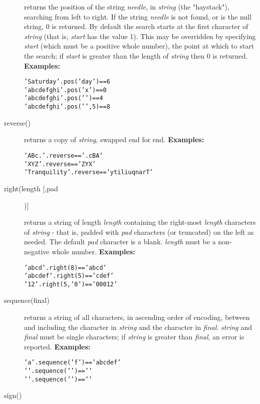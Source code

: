 \begin{description}
returns the position of the string \emph{needle}, in
\emph{string} (the "haystack"), searching from left to right.
If the string \emph{needle} is not found, or is the null string,
0 is returned.
By default the search starts at the first character of
\emph{string} (that is, \emph{start} has the value 1).
This may be overridden by specifying \emph{start} (which must be a
positive whole number), the point at which to start the search; if
\emph{start} is greater than the length of \emph{string} then 0
is returned.
 \textbf{Examples:}
\begin{alltt}
'Saturday'.pos('day')    == 6
'abc def ghi'.pos('x')   == 0
'abc def ghi'.pos(' ')   == 4
'abc def ghi'.pos(' ',5) == 8
\end{alltt}
\item[reverse()]\label{refreverse}

returns a copy of \emph{string}, swapped end for end.
 \textbf{Examples:}
\begin{alltt}
'ABc.'.reverse        == '.cBA'
'XYZ '.reverse        == ' ZYX'
'Tranquility'.reverse == 'ytiliuqnarT'
\end{alltt}
\item[right(length [,pad])]\label{refright}

returns a string of length \emph{length} containing the
right-most \emph{length} characters of \emph{string} -
that is, padded with \emph{pad} characters (or truncated) on the
left as needed.  The default \emph{pad} character is a blank.
\emph{length} must be a non-negative whole number.
 \textbf{Examples:}
\begin{alltt}
'abc  d'.right(8)  == '  abc  d'
'abc def'.right(5) == 'c def'
'12'.right(5,'0')  == '00012'
\end{alltt}
\item[sequence(final)]\label{refsequen}

 returns a string of all characters, in ascending order of encoding,
between and including the character in \emph{string} and the
character in \emph{final}.
\emph{string} and \emph{final} must be single characters;
if \emph{string} is greater than \emph{final}, an error is
reported.
 \textbf{Examples:}
\begin{alltt}
'a'.sequence('f')           == 'abcdef'
'\0'.sequence('')       == ''
'\ufffe'.sequence('\uffff') == '\ufffe\uffff'
\end{alltt}
\item[sign()]\label{refsign}


\end{description}

